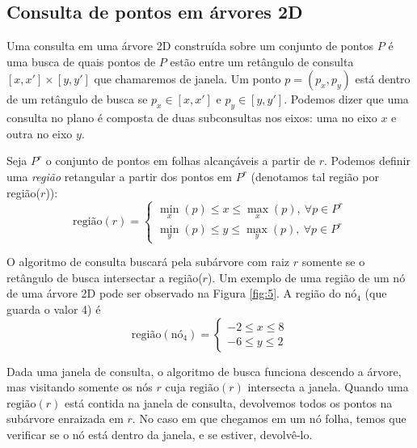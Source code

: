 \subsection{Consulta de pontos em árvores 2D}

Uma consulta em uma árvore 2D construída sobre um conjunto de pontos $P$ é uma busca de quais pontos de $P$ estão entre um retângulo de consulta
\([x,x']  \times  [y,y']\) que chamaremos de janela. Um ponto $p = (p_x, p_y)$ está dentro de um retângulo de busca se $p_x \in [x, x'] \textrm{ e } p_y \in [y, y']$. Podemos dizer que uma consulta no plano é composta de duas subconsultas nos eixos: uma no eixo $x$ e outra no eixo $y$.


Seja $P^r$ o conjunto de pontos em folhas alcançáveis a partir de $r$. Podemos definir uma \emph{região} retangular a partir dos pontos em $P^r$ (denotamos tal região por região($r$)): %
$$
 \mbox{região}(r) = \begin{cases} \min_x(p) \leq x \leq \max_x(p),\ \forall p \in P^r\\ \min_y(p) \leq y \leq \max_y(p),\ \forall p \in P^r \end{cases} 
$$

O algoritmo de consulta buscará pela subárvore com raiz \(r\) somente se o retângulo de busca intersectar a região($r$). Um exemplo de uma região de um nó de uma árvore 2D pode ser observado na Figura \ref{fig:5}. A região do nó$_4$ (que guarda o valor 4) é
$$
\mbox{região}(\mbox{nó}_4) =  \begin{cases} -2 \leq x \leq 8 \\ -6 \leq y \leq 2 \end{cases} 
$$

Dada uma janela de consulta, o algoritmo de busca funciona descendo a árvore, mas visitando somente os nós $r$ cuja
\(\mbox{região}(r)\) intersecta a janela. Quando uma \(\mbox{região}(r)\) está contida na janela de consulta, devolvemos todos os pontos na subárvore enraizada em $r$. No caso em que chegamos em um nó folha, temos que verificar se o nó está dentro da janela, e se estiver, devolvê-lo.

